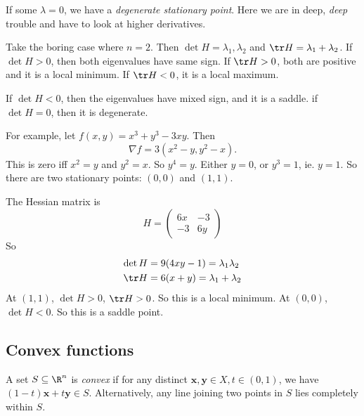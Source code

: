 \documentclass[a4paper]{article}
\begin{document}
If some $\lambda = 0$, we have a \emph{degenerate stationary point}. Here we are in deep, \emph{deep} trouble and have to look at higher derivatives.

\begin{eg}
  Take the boring case where $n = 2$. Then $\det H = \lambda_1, \lambda_2$ and $\tr H = \lambda_1 + \lambda_2$. If $\det H > 0$, then both eigenvalues have same sign. If $\tr H > 0$, both are positive and it is a local minimum. If $\tr H < 0$, it is a local maximum.

  If $\det H < 0$, then the eigenvalues have mixed sign, and it is a saddle. if $\det H = 0$, then it is degenerate.

  For example, let $f(x, y) = x^3 + y^3 - 3xy$. Then
  \[
    \nabla f = 3(x^2 - y, y^2 - x).
  \]
  This is zero iff $x^2 = y$ and $y^2 = x$. So $y^4 = y$. Either $y = 0$, or $y^3 = 1$, ie. $y = 1$. So there are two stationary points: $(0, 0)$ and $(1, 1)$.

  The Hessian matrix is
  \[
    H = 
    \begin{pmatrix}
      6x & -3\\
      -3 & 6y
    \end{pmatrix}
  \]
  So
  \begin{align*}
    \det H &= 9(4xy - 1) = \lambda_1\lambda_2\\
    \tr H &= 6(x + y) = \lambda_1 + \lambda_2
  \end{align*}
  At $(1, 1)$, $\det H > 0$, $\tr H > 0$. So this is a local minimum. At $(0, 0)$, $\det H < 0$. So this is a saddle point.
\end{eg}
\subsection{Convex functions}
\begin{defi}
  A set $S\subseteq \R^n$ is \emph{convex} if for any distinct $\mathbf{x}, \mathbf{y}\in X, t\in (0, 1)$, we have $(1 - t)\mathbf{x} + t\mathbf{y} \in S$. Alternatively, any line joining two points in $S$ lies completely within $S$.

  \begin{center}
  \end{center}
\end{defi}
\end{document}
